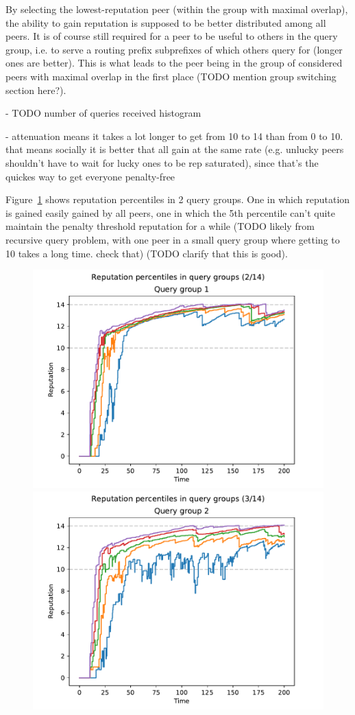 By selecting the lowest-reputation peer (within the group with maximal overlap),
the ability to gain reputation is supposed to be better distributed among all
peers. It is of course still required for a peer to be useful to others in the
query group, i.e. to serve a routing prefix subprefixes of which others query
for (longer ones are better). This is what leads to the peer being in the group
of considered peers with maximal overlap in the first place (TODO mention group
switching section here?).

- TODO number of queries received histogram

- attenuation means it takes a lot longer to get from 10 to 14 than from 0 to
  10. that means socially it is better that all gain at the same rate (e.g.
  unlucky peers shouldn't have to wait for lucky ones to be rep saturated),
  since that's the quickes way to get everyone penalty-free

Figure~\ref{fig:selection_overlap_rep_sorted_rep_percs} shows reputation
percentiles in 2 query groups. One in which reputation is gained easily gained
by all peers, one in which the 5th percentile can't quite maintain the penalty
threshold reputation for a while (TODO likely from recursive query problem, with
one peer in a small query group where getting to 10 takes a long time.  check
that) (TODO clarify that this is good).

\begin{figure}[t]
\centering
\includegraphics[width=0.5\columnwidth]{figures/selection_overlap_rep_sorted_rep_percs_2_of_14}%
\includegraphics[width=0.5\columnwidth]{figures/selection_overlap_rep_sorted_rep_percs_3_of_14}
\label{fig:selection_overlap_rep_sorted_rep_percs}
\end{figure}


